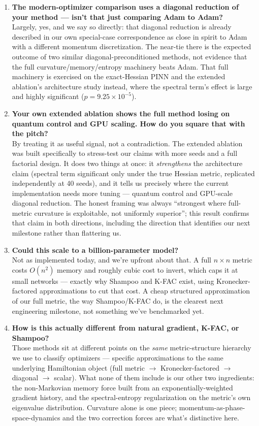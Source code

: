\documentclass[11pt]{article}
\begin{document}
\begin{enumerate}[leftmargin=1.4em, itemsep=0.9em]
\item \textbf{The modern-optimizer comparison uses a diagonal reduction of your method --- isn't that just comparing Adam to Adam?}\\
Largely, yes, and we say so directly: that diagonal reduction is already described in our own
special-case correspondence as close in spirit to Adam with a different momentum discretization.
The near-tie there is the expected outcome of two similar diagonal-preconditioned methods, not
evidence that the full curvature/memory/entropy machinery beats Adam. That full machinery is
exercised on the exact-Hessian PINN and the extended ablation's architecture study instead, where
the spectral term's effect is large and highly significant ($p=9.25\times10^{-5}$).

\item \textbf{Your own extended ablation shows the full method losing on quantum control and GPU scaling. How do you square that with the pitch?}\\
By treating it as useful signal, not a contradiction. The extended ablation was built specifically
to stress-test our claims with more seeds and a full factorial design. It does two things at once:
it \emph{strengthens} the architecture claim (spectral term significant only under the true
Hessian metric, replicated independently at 40 seeds), and it tells us precisely where the current
implementation needs more tuning --- quantum control and GPU-scale diagonal reduction. The honest
framing was always ``strongest where full-metric curvature is exploitable, not uniformly
superior''; this result confirms that claim in both directions, including the direction that
identifies our next milestone rather than flattering us.

\item \textbf{Could this scale to a billion-parameter model?}\\
Not as implemented today, and we're upfront about that. A full $n\times n$ metric costs $O(n^2)$
memory and roughly cubic cost to invert, which caps it at small networks --- exactly why Shampoo
and K-FAC exist, using Kronecker-factored approximations to cut that cost. A cheap structured
approximation of our full metric, the way Shampoo/K-FAC do, is the clearest next engineering
milestone, not something we've benchmarked yet.

\item \textbf{How is this actually different from natural gradient, K-FAC, or Shampoo?}\\
Those methods sit at different points on the \emph{same} metric-structure hierarchy we use to
classify optimizers --- specific approximations to the same underlying Hamiltonian object (full
metric $\to$ Kronecker-factored $\to$ diagonal $\to$ scalar). What none of them include is our
other two ingredients: the non-Markovian memory force built from an exponentially-weighted
gradient history, and the spectral-entropy regularization on the metric's own eigenvalue
distribution. Curvature alone is one piece; momentum-as-phase-space-dynamics and the two
correction forces are what's distinctive here.


\end{enumerate}
\end{document}

